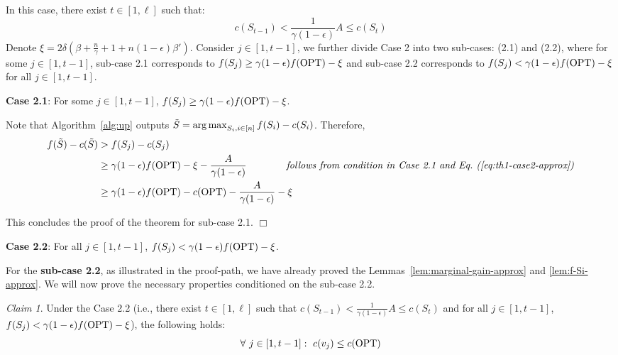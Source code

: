 \documentclass[10pt]{article} %
\DeclareMathOperator*{\argmax}{arg\,max}
\theoremstyle{remark}
\newtheorem{claim}[theorem]{Claim}
\newcommand{\OPT}{{\rm OPT}}
\begin{document}
In this case, there exist $t\in[1, \ell]$ such that:
    \begin{equation}
        c(S_{t-1})< \frac{1}{\gamma (1-\epsilon)} A  \leq c(S_t)
        \label{eq:th1-case2-approx}
    \end{equation}
Denote $\xi = 2\delta\left(\beta+ \frac{n}{\gamma} + 1 + n(1-\epsilon)\beta'\right)$. 
Consider $j \in [1, t-1]$, we further divide Case 2 into two sub-cases: (2.1) and (2.2), where for some $j \in [1,t-1]$, sub-case 2.1 corresponds to $f(S_{j}) \geq \gamma (1-\epsilon)f(\OPT) - \xi$  and sub-case 2.2 corresponds to $f(S_{j}) < \gamma (1-\epsilon)f(\OPT)-\xi$ for all $j \in [1,t-1]$.

\textbf{Case 2.1}: For some $j\in [1,t-1]$, $f(S_{j}) \geq \gamma (1-\epsilon)f(\OPT) - \xi$.

Note that Algorithm~\ref{alg:up} outputs $\Tilde{S} = \argmax_{S_i, i \in [n]} f(S_i)-c(S_i)$.
Therefore, 
\begin{align*}
f(\Tilde{S}) - c(\Tilde{S}) & > f(S_j) - c(S_j) \\
&\geq  \gamma (1-\epsilon)f(\OPT) - \xi - \displaystyle\frac{A}{\gamma(1-\epsilon)}  \quad\quad\quad\quad \mbox{\it follows from  condition in Case 2.1 and Eq.~(\ref{eq:th1-case2-approx})} \\
& \geq  \gamma (1-\epsilon)f(\OPT) - c(\OPT) - \displaystyle\frac{A}{\gamma(1-\epsilon)} - \xi
\end{align*}


This concludes the proof of the theorem for sub-case 2.1.  \hfill $\Box$

\textbf{Case 2.2}: For all $j\in [1,t-1]$, $f(S_{j}) < \gamma (1-\epsilon)f(\OPT) - \xi$.

For the \textbf{sub-case 2.2}, as illustrated in the proof-path, we have already
proved the Lemmas~\ref{lem:marginal-gain-approx} and \ref{lem:f-Si-approx}. We will now prove
the necessary properties conditioned on the sub-case 2.2. 

\begin{claim}
\label{claim:single-cost-approx}
Under the Case 2.2 (i.e., 
there exist $t\in[1, \ell]$ such that
$c(S_{t-1})< \frac{1}{\gamma (1-\epsilon)} A  \leq c(S_t)$
and for all $j\in[1, t-1]$, $f(S_{j}) < \gamma (1-\epsilon)f(\OPT) -\xi$),
the following holds: 
 \[\forall~j \in [1, t-1]: ~c(v_j) \leq c(\OPT)\]
\end{claim}
\end{document}
